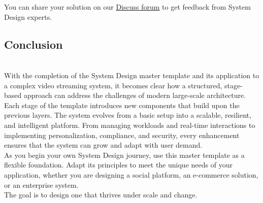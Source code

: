 You can share your solution on our \href{https://discuss.educative.io/}{Discuss forum} to get feedback from System Design experts.

\subsection{Conclusion}\label{6nIcnu6Dfh77dKszK-5Kw}
\\
With the completion of the System Design master template and its application to a complex video streaming system, it becomes clear how a structured, stage-based approach can address the challenges of modern large-scale architecture.
\\
Each stage of the template introduces new components that build upon the previous layers. The system evolves from a basic setup into a scalable, resilient, and intelligent platform. From managing workloads and real-time interactions to implementing personalization, compliance, and security, every enhancement ensures that the system can grow and adapt with user demand.
\\
As you begin your own System Design journey, use this master template as a flexible foundation. Adapt its principles to meet the unique needs of your application, whether you are designing a social platform, an e-commerce solution, or an enterprise system.
\\
The goal is to design one that thrives under scale and change.

